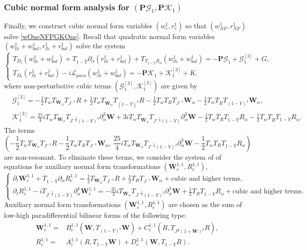 \documentclass[10pt]{amsart}
\theoremstyle{remark}
\theoremstyle{definition}
\numberwithin{equation}{section}
\newcommand{\p}{\partial}
\newcommand{\al}{\alpha}
\newcommand{\f}{\frac}
\newcommand{\bw}{\mathbf{W}}
\newcommand{\nP}{{\mathbf P}}
\begin{document}
\subsubsection{Cubic normal form analysis for $(\nP\mathcal{G}_1, \nP\mathcal{K}_1)$}
Finally, we construct cubic normal form variables $(w^1_c, r^1_c)$ so that $(w_{NF}^1, r_{NF}^1)$ solve \eqref{wOneNFPGKOne}.
Recall that quadratic normal form variables $(w^1_{lh}+w^1_{bal}, r^1_{lh}+ r^1_{bal})$ solve the system
\begin{equation*} 
\begin{cases}
T_{D_t}(w^1_{lh}+w^1_{bal})+T_{1-\bar{Y}}\p_\al (r^1_{lh}+r^1_{bal})+T_{T_{1-\bar{Y}}R_{\al}}(w^1_{lh}+w^1_{bal})= -\nP \mathcal{G}_1 + \mathcal{G}_1^{[3]} + G,\\
T_{D_t}(r^1_{lh}+r^1_{bal})-i\mathcal{L}_{para}(w^1_{lh}+w^1_{bal})=- \nP \mathcal{K}_1 + \mathcal{K}_1^{[3]} +K,
\end{cases}
\end{equation*}
where non-perturbative cubic terms $( \mathcal{G}_1^{[3]},  \mathcal{K}_1^{[3]})$ are given by
\begin{align*}
 &\mathcal{G}_1^{[3]} = - \f12 T_{w}T_{\bw_\al}T_{J^{-1}}R + \f12 T_{w}T_{\bar{\bw}_\al}T_{(1-\bar{Y})^2}R - \f12 T_w T_R T_{J^{-1}}\bw_\al - \f12 T_w T_{\bar{R}} T_{(1-Y)^2}\bw_\al,\\
  &\mathcal{K}_1^{[3]} = \f{25}{4}i T_{w} T_{\bw_\al} T_{J^{-\f32}(1-Y)^3} \p_\al^3 \bw +3i T_{w} T_{\bar{\bw}_\al} T_{J^{-\f52}(1-Y)}  \p_\al^3 \bw - \f12 T_w T_R T_{1-\bar{Y}}R_\al - \f12 T_w T_{\bar{R}} T_{1-Y}R_\al.
\end{align*}
The terms
\begin{equation*}
    \left(- \f12 T_{w}T_{\bw_\al}T_{J^{-1}}R- \f12 T_w T_R T_{J^{-1}}\bw_\al,\,  \f{25}{4}i T_{w} T_{\bw_\al} T_{J^{-\f32}(1-Y)^3} \p_\al^3 \bw - \f12 T_w T_R T_{1-\bar{Y}}R_\al  \right)
\end{equation*}
are non-resonant. To eliminate these terms, we consider the system of of equations for auxiliary normal form transformations $(\bw^{1,1}_c, R^{1,1}_c)$,
\begin{equation*}  
\begin{cases}
\p_t \bw^{1,1}_c+T_{1-\bar{Y}}\p_\al R^{1,1}_c=\f12 T_{\bw_\al}T_{J^{-1}}R+\f12 T_R T_{J^{-1}}\bw_\al  + \text{cubic and higher terms},\\
\p_t R^{1,1}_c-iT_{J^{-\f32}(1-Y)}\p_\al^4\bw^{1,1}_c= -\f{25}{4}i  T_{\bw_\al} T_{J^{-\f32}(1-Y)^3} \p_\al^3 \bw +\f12  T_R T_{1-\bar{Y}}R_\al + \text{cubic and higher terms}.
\end{cases}
\end{equation*}
Auxiliary normal form transformations $(\bw^{1,1}_c, R^{1,1}_c)$ are chosen as the sum of low-high paradifferential bilinear forms of the following type:
\begin{align*} 
\bw^{1,1}_{c} = &B^{1,1}_{c}\left(\bw, T_{(1-Y)^2}\bw \right) + C^{1,1}_{c}\left(R, T_{J^\f12(1+\bw)^2}R \right),\\
R^{1,1}_{c} =& A^{1,1}_{c} \left(R, T_{1-Y}\bw \right) + D^{1,1}_{c}\left(\bw, T_{1-Y}R\right).
\end{align*}
\end{document}
